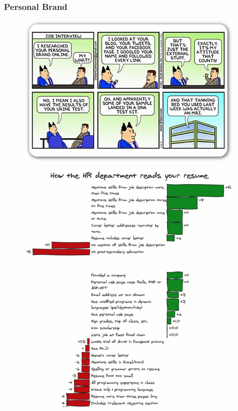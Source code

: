 \begin{frame}
	\frametitle{Personal Brand}
	\begin{figure}
		\includegraphics[scale=.5]{assets/personal-brand}
	\end{figure}
\end{frame}


\begin{frame}
	\begin{figure}
		\includegraphics[scale=.35]{assets/diff1}
	\end{figure}
\end{frame}

\begin{frame}
	\begin{figure}
		\includegraphics[scale=.35]{assets/diff2}
	\end{figure}
\end{frame}


